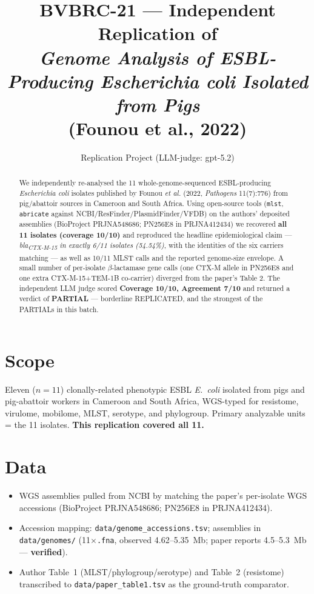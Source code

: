 \documentclass[11pt]{article}
\title{BVBRC-21 --- Independent Replication of \\
       \emph{Genome Analysis of ESBL-Producing Escherichia coli Isolated from Pigs} \\
       (Founou et al., 2022)}
\author{Replication Project (LLM-judge: gpt-5.2)}
\date{}
\begin{document}
\maketitle

\begin{abstract}
We independently re-analysed the 11 whole-genome-sequenced ESBL-producing
\emph{Escherichia coli} isolates published by Founou \emph{et al.} (2022,
\emph{Pathogens} 11(7):776) from pig/abattoir sources in Cameroon and South
Africa. Using open-source tools (\texttt{mlst}, \texttt{abricate} against
NCBI/ResFinder/PlasmidFinder/VFDB) on the authors' deposited assemblies
(BioProject PRJNA548686; PN256E8 in PRJNA412434) we recovered
\textbf{all 11 isolates (coverage 10/10)} and reproduced the headline
epidemiological claim --- \emph{bla\textsubscript{CTX-M-15} in exactly 6/11
isolates (54.54\%)}, with the identities of the six carriers matching --- as
well as 10/11 MLST calls and the reported genome-size envelope. A small number
of per-isolate $\beta$-lactamase gene calls (one CTX-M allele in PN256E8 and
one extra CTX-M-15+TEM-1B co-carrier) diverged from the paper's Table 2. The
independent LLM judge scored \textbf{Coverage 10/10, Agreement 7/10} and
returned a verdict of \textbf{PARTIAL} --- borderline REPLICATED, and the
strongest of the PARTIALs in this batch.
\end{abstract}

\section{Scope}
Eleven ($n=11$) clonally-related phenotypic ESBL \emph{E.\ coli} isolated
from pigs and pig-abattoir workers in Cameroon and South Africa, WGS-typed for
resistome, virulome, mobilome, MLST, serotype, and phylogroup. Primary
analyzable units = the 11 isolates. \textbf{This replication covered all 11.}

\section{Data}
\begin{itemize}[leftmargin=1.2em]
  \item WGS assemblies pulled from NCBI by matching the paper's per-isolate
        WGS accessions (BioProject PRJNA548686; PN256E8 in PRJNA412434).
  \item Accession mapping: \texttt{data/genome\_accessions.tsv}; assemblies in
        \texttt{data/genomes/} (11$\times$\texttt{.fna}, observed 4.62--5.35~Mb;
        paper reports 4.5--5.3~Mb --- \textbf{verified}).
  \item Author Table~1 (MLST/phylogroup/serotype) and Table~2 (resistome)
        transcribed to \texttt{data/paper\_table1.tsv} as the ground-truth
        comparator.
\end{itemize}
\end{document}
